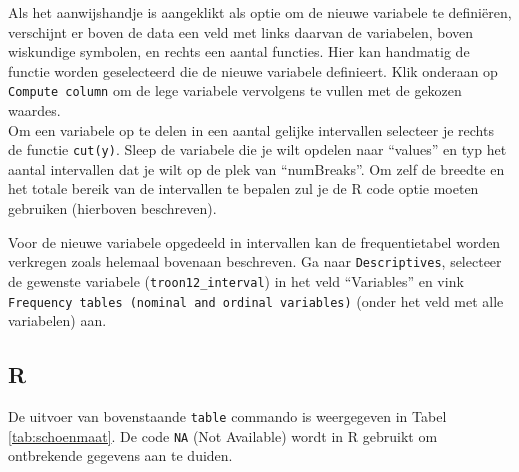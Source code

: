 \documentclass[
]{book}
\newenvironment{Shaded}{\begin{snugshade}}{\end{snugshade}}
\newcommand{\CommentTok}[1]{\textcolor[rgb]{0.56,0.35,0.01}{\textit{#1}}}
\newcommand{\DataTypeTok}[1]{\textcolor[rgb]{0.13,0.29,0.53}{#1}}
\newcommand{\DecValTok}[1]{\textcolor[rgb]{0.00,0.00,0.81}{#1}}
\newcommand{\KeywordTok}[1]{\textcolor[rgb]{0.13,0.29,0.53}{\textbf{#1}}}
\newcommand{\NormalTok}[1]{#1}
\newcommand{\OperatorTok}[1]{\textcolor[rgb]{0.81,0.36,0.00}{\textbf{#1}}}
\newcommand{\OtherTok}[1]{\textcolor[rgb]{0.56,0.35,0.01}{#1}}
\newcommand{\StringTok}[1]{\textcolor[rgb]{0.31,0.60,0.02}{#1}}
\begin{document}
Als het aanwijshandje is aangeklikt als optie om de nieuwe variabele te definiëren, verschijnt er boven de data een veld met links daarvan de variabelen, boven wiskundige symbolen, en rechts een aantal functies. Hier kan handmatig de functie worden geselecteerd die de nieuwe variabele definieert. Klik onderaan op \texttt{Compute\ column} om de lege variabele vervolgens te vullen met de gekozen waardes.\\
Om een variabele op te delen in een aantal gelijke intervallen selecteer je rechts de functie \texttt{cut(y)}. Sleep de variabele die je wilt opdelen naar ``values'' en typ het aantal intervallen dat je wilt op de plek van ``numBreaks''. Om zelf de breedte en het totale bereik van de intervallen te bepalen zul je de R code optie moeten gebruiken (hierboven beschreven).

Voor de nieuwe variabele opgedeeld in intervallen kan de frequentietabel worden verkregen zoals helemaal bovenaan beschreven. Ga naar \texttt{Descriptives}, selecteer de gewenste variabele (\texttt{troon12\_interval}) in het veld ``Variables'' en vink \texttt{Frequency\ tables\ (nominal\ and\ ordinal\ variables)} (onder het veld met alle variabelen) aan.

\hypertarget{r-1}{%
\subsection{R}\label{r-1}}

\begin{Shaded}
\end{Shaded}

De uitvoer van bovenstaande \texttt{table} commando is weergegeven in Tabel \ref{tab:schoenmaat}.
De code \texttt{NA} (Not Available) wordt in R gebruikt om ontbrekende gegevens aan te duiden.

\begin{Shaded}
\end{Shaded}
\end{document}
